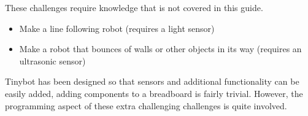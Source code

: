 \documentclass[a4paper,12pt]{article}
\begin{document}
\bigskip


These challenges require knowledge that is not covered in this guide.
\begin{itemize}
    \item Make a line following robot (requires a light sensor)
    \item Make a robot that bounces of walls or other objects in its way (requires an ultrasonic sensor)
\end{itemize}
Tinybot has been designed so that sensors and additional functionality can be easily added, adding components to a breadboard is fairly trivial. However, the programming aspect of these extra challenging challenges is quite involved.
\end{document}
